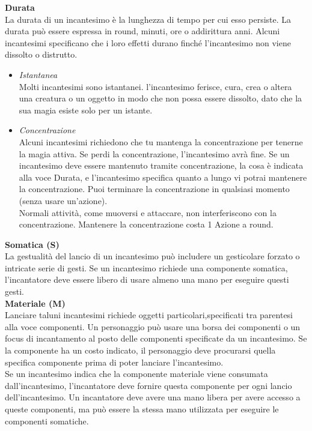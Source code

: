 \textbf{Durata}\\
La durata di un incantesimo è la lunghezza di tempo per cui esso persiste. La durata può essere espressa in round, minuti, ore o addirittura anni. Alcuni incantesimi specificano che i loro effetti durano finché l'incantesimo non viene dissolto o distrutto.\\
\begin{itemize}
\item
\textit{Istantanea}\\
Molti incantesimi sono istantanei. l'incantesimo ferisce, cura, crea o altera una creatura o un oggetto in modo che non possa essere dissolto, dato che la sua magia esiste solo per un istante.\\
\item
\textit{Concentrazione}\\
Alcuni incantesimi richiedono che tu mantenga la concentrazione per tenerne la magia attiva. Se perdi la concentrazione, l'incantesimo avrà fine. Se un incantesimo deve essere mantenuto tramite concentrazione, la cosa è indicata alla voce Durata, e l'incantesimo specifica quanto a lungo vi potrai mantenere la concentrazione. Puoi terminare la concentrazione in qualsiasi momento (senza usare un'azione).\\
Normali attività, come muoversi e attaccare, non interferiscono con la concentrazione.
Mantenere la concentrazione costa 1 Azione a round.
\end{itemize}

\textbf{Somatica (S)}\\
La gestualità del lancio di un incantesimo può includere un gesticolare forzato o intricate serie di gesti. Se un incantesimo richiede una componente somatica, l’incantatore deve essere libero di usare almeno una mano per eseguire questi gesti.\\
\textbf{Materiale (M)}\\
Lanciare taluni incantesimi richiede oggetti particolari,specificati tra parentesi alla voce componenti. Un personaggio può usare una borsa dei componenti o un focus di incantamento al posto delle componenti specificate da un incantesimo. Se la componente ha un costo indicato, il personaggio deve procurarsi quella specifica componente prima di poter lanciare l'incantesimo.\\
Se un incantesimo indica che la componente materiale viene consumata dall'incantesimo, l’incantatore deve fornire questa componente per ogni lancio dell'incantesimo.
Un incantatore deve avere una mano libera per avere accesso a queste componenti, ma può essere la stessa mano utilizzata per eseguire le componenti somatiche.\\

